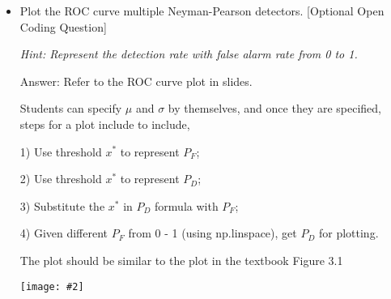 \documentclass{article}
\newenvironment{answer}{\par\begingroup\color{answer}Answer: }{\endgroup}
\newcommand{\hint}[1]{\textcolor{black!60!white}{\emph{Hint: #1}}}
\newcommand{\centerfig}[2]{\begin{center}\texttt{[image: \#2]}\end{center}}
\begin{document}
\begin{itemize}
\begin{answer}
Rearrange the values in the equation 
\[
x^*= \frac{2 \sigma^2 \eta +\mu_1^2 -\mu_0^2 }{2\mu_1 - 2\mu_0}
\]
We can also get
\[
\eta = \frac{(1.64\sigma + \mu_0)*(2\mu_1 - 2\mu_0) - \mu_1^2 + \mu_0^2}{2*\sigma^2}
\]
\end{answer}

\item Plot the ROC curve multiple Neyman-Pearson detectors. [Optional Open Coding Question]

\hint{%
Represent the detection rate with false alarm rate from 0 to 1.
}
\begin{answer}
    Refer to the ROC curve plot in slides.

    Students can specify $\mu$ and $\sigma$ by themselves, and once they are specified,
    steps for a plot include to include, 
    
    1) Use threshold $x^*$ to represent $P_F$;
    
    2) Use threshold $x^*$ to represent $P_D$;

    3) Substitute the $x^*$ in $P_D$ formula with $P_F$;

    4) Given different $P_F$ from 0 - 1 (using np.linspace), get $P_D$ for plotting.

    The plot should be similar to the plot in the textbook Figure 3.1
    \centerfig{.4}{ROC.png}
\end{answer}

\end{itemize}
\end{document}
